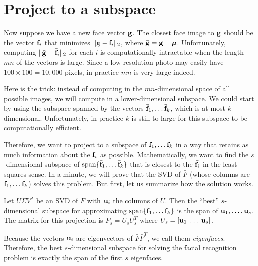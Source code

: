 \section*{Project to a subspace}
Now suppose we have a new face vector ${\bf g}$. 
The closest face image to ${\bf g}$ should be the vector $\bar{{\bf f}}_i$ that minimizes $\|\bar{{\bf g}}-\bar{{\bf f}}_i\|_2$, where $\bar{{\bf g}} = {\bf g} - {\boldsymbol \mu}$.
Unfortunately, computing $\|\bar{{\bf g}}-\bar{{\bf f}}_i\|_2$ for each $i$ is computationally intractable when the length $mn$ of the vectors is large.
Since a low-resolution photo may easily have $100\times 100 = 10,000$ pixels, in practice $mn$ is very large indeed.

Here is the trick: instead of computing in the $mn$-dimensional space of all possible images, we will compute in a lower-dimensional subspace.
We could start by using the subspace spanned by the vectors $\bar{{\bf f}}_1, \ldots \bar{{\bf f}}_k$, which is at most $k$-dimensional. 
Unfortunately, in practice $k$ is still to large for this subspace to be computationally efficient.

Therefore, we want to project to a subspace of $\bar{{\bf f}}_1, \ldots \bar{{\bf f}}_k$ in a way that retains as much information about the $\bar{{\bf f}_i}$ as possible.
Mathematically, we want to find the $s$-dimensional subspace of $\text{span}\{\bar{{\bf f}}_1, \ldots \bar{{\bf f}}_k\}$ that is closest to the $\bar{{\bf f}_i}$ in the least-squares sense.
In a minute, we will prove that the SVD of $\bar{F}$ (whose columns are $\bar{{\bf f}}_1, \ldots \bar{{\bf f}}_k$) solves this problem.
But first, let us summarize how the solution works.

Let $U \Sigma V^T$ be an SVD of $\bar{F}$ with ${\bf u}_i$ the columns of $U$. 
Then the ``best'' $s$-dimensional subspace for approximating $\text{span}\{\bar{{\bf f}}_1, \ldots \bar{{\bf f}}_k\}$ is the span of ${\bf u}_1, \ldots, {\bf u}_s$. 
The matrix for this projection is $P_s = U_s U_s^T$ where $U_s = [ {\bf u}_1\; \ldots \; {\bf u}_s]$.

Because the vectors ${\bf u}_i$ are eigenvectors of $\bar{F}\bar{F}^T$, we call them \emph{eigenfaces}. 
Therefore, the best $s$-dimensional subspace for solving the facial recognition problem is exactly the span of the first $s$ eigenfaces.

